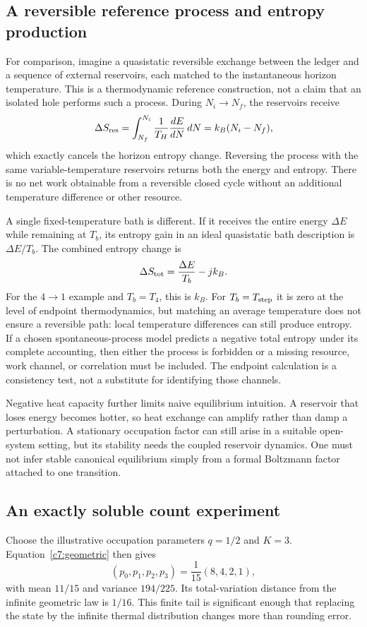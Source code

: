 \subsection{A reversible reference process and entropy production}
For comparison, imagine a quasistatic reversible exchange between the ledger and a sequence of external reservoirs, each matched to the instantaneous horizon temperature. This is a thermodynamic reference construction, not a claim that an isolated hole performs such a process. During $N_i\to N_f$, the reservoirs receive
\begin{equation}
 \Delta S_{\rm res}=\int_{N_f}^{N_i}\frac{1}{T_H}\frac{dE}{dN}\,dN
 =k_B(N_i-N_f),
 \label{c7:revreservoir}
\end{equation}
which exactly cancels the horizon entropy change. Reversing the process with the same variable-temperature reservoirs returns both the energy and entropy. There is no net work obtainable from a reversible closed cycle without an additional temperature difference or other resource.

A single fixed-temperature bath is different. If it receives the entire energy $\Delta E$ while remaining at $T_b$, its entropy gain in an ideal quasistatic bath description is $\Delta E/T_b$. The combined entropy change is
\begin{equation}
 \Delta S_{\rm tot}=\frac{\Delta E}{T_b}-jk_B.
 \label{c7:fixedbath}
\end{equation}
For the $4\to1$ example and $T_b=T_4$, this is $k_B$. For $T_b=T_{\rm step}$ it is zero at the level of endpoint thermodynamics, but matching an average temperature does not ensure a reversible path: local temperature differences can still produce entropy. If a chosen spontaneous-process model predicts a negative total entropy under its complete accounting, then either the process is forbidden or a missing resource, work channel, or correlation must be included. The endpoint calculation is a consistency test, not a substitute for identifying those channels.

Negative heat capacity further limits naive equilibrium intuition. A reservoir that loses energy becomes hotter, so heat exchange can amplify rather than damp a perturbation. A stationary occupation factor can still arise in a suitable open-system setting, but its stability needs the coupled reservoir dynamics. One must not infer stable canonical equilibrium simply from a formal Boltzmann factor attached to one transition.

\subsection{An exactly soluble count experiment}
Choose the illustrative occupation parameters $q=1/2$ and $K=3$. Equation~\eqref{c7:geometric} then gives
\begin{equation}
 (p_0,p_1,p_2,p_3)=\frac1{15}(8,4,2,1),
 \label{c7:countinput}
\end{equation}
with mean $11/15$ and variance $194/225$. Its total-variation distance from the infinite geometric law is $1/16$. This finite tail is significant enough that replacing the state by the infinite thermal distribution changes more than rounding error.

